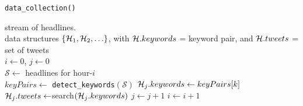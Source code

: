 \begin{algorithm}
  \caption{{\tt data\_collection()}}
  \label{alg:data_collection}
  \begin{algorithmic}[1]
    \REQUIRE stream of headlines. \\
    \ENSURE data structures $\{\mathcal{H}_1, \mathcal{H}_2, \ldots \}$, with $\mathcal{H}.keywords$ = keyword pair, and $\mathcal{H}.tweets$ = set of tweets\\
    \STATE $i \leftarrow 0$, $j \leftarrow 0$ \\
    \LOOP
    \STATE $\mathcal{S} \leftarrow$ headlines for hour-$i$ \\
    \STATE $keyPairs \leftarrow$ {\tt detect\_keywords$(\mathcal{S})$}
     
    \STATE $\mathcal{H}_j.keywords \leftarrow keyPairs[k]$ \\
    \STATE $\mathcal{H}_j.tweets \leftarrow $search$(\mathcal{H}_j.keywords)$
     \STATE $j \leftarrow j+1$
    \ENDFOR
    \STATE $i \leftarrow i+1$
    \ENDLOOP
  \end{algorithmic}
\end{algorithm}


